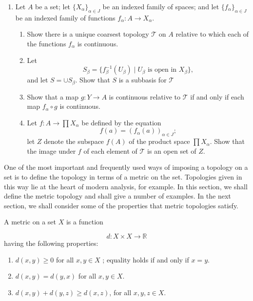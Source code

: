 \begin{enumerate}[itemsep=0.4em, parsep=0pt, topsep=0pt, partopsep=0pt, leftmargin=*, label=\arabic*., ref=\arabic*]
\item Let \(A\) be a set; let \({\{ X_{\alpha }\} }_{\alpha \in J}\) be an indexed family of spaces; and let \({\{ f_{\alpha }\} }_{\alpha \in J}\) be an indexed family of functions \(f_{\alpha } : A \rightarrow {X}_{\alpha }\).
  \begin{enumerate}[itemsep=0.2em, parsep=0pt, topsep=0pt, partopsep=0pt, leftmargin=*, label=(\alph*), align=left]
  \item Show there is a unique coarsest topology \(\mathcal{T}\) on \(A\) relative to which each of the functions \(f_{\alpha }\) is continuous.
  \item Let \[ S_{\beta } = \{ {f_{\beta }^{-1}( U_{\beta }) \mid {U}_{\beta }\text{ is open in }X_{\beta }}\}, \] and let \(S = \cup {S}_{\beta }\). Show that \(S\) is a subbasis for \(\mathcal{T}\)
  \item Show that a map \(g : Y \rightarrow A\) is continuous relative to \(\mathcal{T}\) if and only if each map \(f_{\alpha } \circ g\) is continuous.
  \item Let \(f : A \rightarrow \prod {X}_{\alpha }\) be defined by the equation \[ f( a) = {( f_{\alpha }( a) ) }_{\alpha \in J}; \] let \(Z\) denote the subspace \(f( A)\) of the product space \(\prod {X}_{\alpha }\). Show that the image under \(f\) of each element of \(\mathcal{T}\) is an open set of \(Z\).
  \end{enumerate}
\end{enumerate}

One of the most important and frequently used ways of imposing a topology on a set is to define the topology in terms of a metric on the set. Topologies given in this way lie at the heart of modern analysis, for example. In this section, we shall define the metric topology and shall give a number of examples. In the next section, we shall consider some of the properties that metric topologies satisfy.

\begin{definition}
 A metric on a set \(X\) is a function

 \[
 d : X \times X \rightarrow \mathbb{R}
 \]
 having the following properties:

 \begin{enumerate}[itemsep=0.2em, parsep=0pt, topsep=0pt, partopsep=0pt, leftmargin=*, label=(\arabic*), align=left]
 \item \(d( {x,y}) \geq 0\) for all \(x,y \in X\) ; equality holds if and only if \(x = y\).
 \item \(d( {x,y}) = d( {y,x})\) for all \(x,y \in X\).
 \item \(d( {x,y}) + d( {y,z}) \geq d( {x,z})\), for all \(x,y,z \in X\).
 \end{enumerate}
\end{definition}

